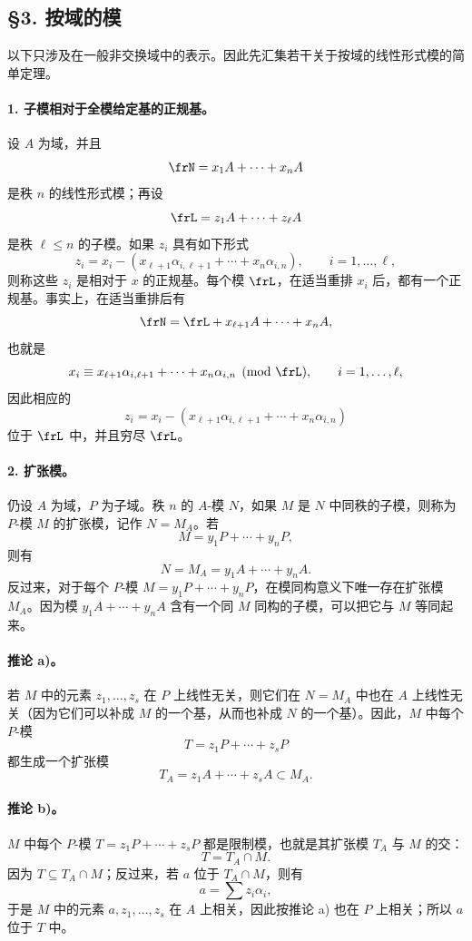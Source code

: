 \subsection*{§3. 按域的模}

以下只涉及在一般非交换域中的表示。因此先汇集若干关于按域的线性形式模的简单定理。

\paragraph{1. 子模相对于全模给定基的正规基。}
设 \(A\) 为域，并且
\[
        \frN=x_1A+\cdots+x_nA
\]
是秩 \(n\) 的线性形式模；再设
\[
        \frL=z_1A+\cdots+z_\ell A
\]
是秩 \(\ell\le n\) 的子模。如果 \(z_i\) 具有如下形式
\[
        z_i=x_i-(x_{\ell+1}\alpha_{i,\ell+1}+\cdots+x_n\alpha_{i,n}),
        \qquad i=1,\ldots,\ell,
\]
则称这些 \(z_i\) 是相对于 \(x\) 的正规基。每个模 \(\frL\)，在适当重排 \(x_i\) 后，都有一个正规基。事实上，在适当重排后有
\[
        \frN=\frL+x_{\ell+1}A+\cdots+x_nA,
\]
也就是
\[
        x_i\equiv x_{\ell+1}\alpha_{i,\ell+1}+\cdots+x_n\alpha_{i,n}
        \pmod{\frL},\qquad i=1,\ldots,\ell,
\]
因此相应的
\[
        z_i=x_i-(x_{\ell+1}\alpha_{i,\ell+1}+\cdots+x_n\alpha_{i,n})
\]
位于 \(\frL\) 中，并且穷尽 \(\frL\)。

\paragraph{2. 扩张模。}
仍设 \(A\) 为域，\(P\) 为子域。秩 \(n\) 的 \(A\)-模 \(N\)，如果 \(M\) 是 \(N\) 中同秩的子模，则称为 \(P\)-模 \(M\) 的扩张模，记作 \(N=M_A\)。若
\[
        M=y_1P+\cdots+y_nP,
\]
则有
\[
        N=M_A=y_1A+\cdots+y_nA.
\]
反过来，对于每个 \(P\)-模 \(M=y_1P+\cdots+y_nP\)，在模同构意义下唯一存在扩张模 \(M_A\)。因为模 \(y_1A+\cdots+y_nA\) 含有一个同 \(M\) 同构的子模，可以把它与 \(M\) 等同起来。

\paragraph{推论 a)。}
若 \(M\) 中的元素 \(z_1,\ldots,z_s\) 在 \(P\) 上线性无关，则它们在 \(N=M_A\) 中也在 \(A\) 上线性无关（因为它们可以补成 \(M\) 的一个基，从而也补成 \(N\) 的一个基）。因此，\(M\) 中每个 \(P\)-模
\[
        T=z_1P+\cdots+z_sP
\]
都生成一个扩张模
\[
        T_A=z_1A+\cdots+z_sA\subset M_A.
\]

\paragraph{推论 b)。}
\(M\) 中每个 \(P\)-模 \(T=z_1P+\cdots+z_sP\) 都是限制模，也就是其扩张模 \(T_A\) 与 \(M\) 的交：
\[
        T=T_A\cap M .
\]
因为 \(T\subseteq T_A\cap M\)；反过来，若 \(a\) 位于 \(T_A\cap M\)，则有
\[
        a=\sum z_i\alpha_i,
\]
于是 \(M\) 中的元素 \(a,z_1,\ldots,z_s\) 在 \(A\) 上相关，因此按推论 a) 也在 \(P\) 上相关；所以 \(a\) 位于 \(T\) 中。

